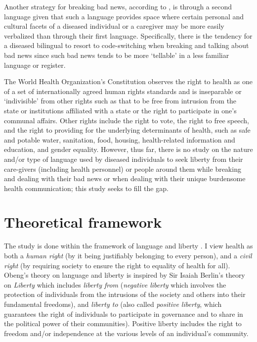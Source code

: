 \documentclass[output=paper,colorlinks,citecolor=brown]{langscibook}
\begin{document}
Another strategy for breaking bad news, according to \citet{Movahedi1996}, is through a second language given that such a language provides space where certain personal and cultural facets of a diseased individual or a caregiver may be more easily verbalized than through their first language. Specifically, there is the tendency for a diseased bilingual to resort to code-switching when breaking and talking about bad news since such bad news tends to be more ‘tellable’ in a less familiar language or register.

The World Health Organization’s Constitution \citep{World-Health-Organization1946} observes the right to health as one of a set of internationally agreed human rights standards and is inseparable or ‘indivisible’ from other rights such as that to be free from intrusion from the state or institutions affiliated with a state or the right to participate in one’s communal affairs. Other rights include the right to vote, the right to free speech, and the right to providing for the underlying determinants of health, such as safe and potable water, sanitation, food, housing, health-related information and education, and gender equality. However, thus far, there is no study on the nature and/or type of language used by diseased individuals to seek liberty from their care-givers (including health personnel) or people around them while breaking and dealing with their bad news or when dealing with their unique burdensome health communication; this study seeks to fill the gap. 

\section{Theoretical framework}\label{sec:obeng:2}

The study is done within the framework of language and liberty \citep{Obeng2020, Obeng2018}. I view health as both a \textit{human right} (by it being justifiably belonging to every person), and a \textit{civil right} (by requiring society to ensure the right to equality of health for all). Obeng’s theory on language and liberty is inspired by Sir Isaiah Berlin’s \citep{Berlin1960} theory on \textit{Liberty} which includes \textit{liberty from} (\textit{negative liberty} which involves the protection of individuals from the intrusions of the society and others into their fundamental freedoms), and \textit{liberty to} (also called \textit{positive liberty}, which guarantees the right of individuals to participate in governance and to share in the political power of their communities). Positive liberty includes the right to freedom and/or independence at the various levels of an individual’s community. 
\end{document}
